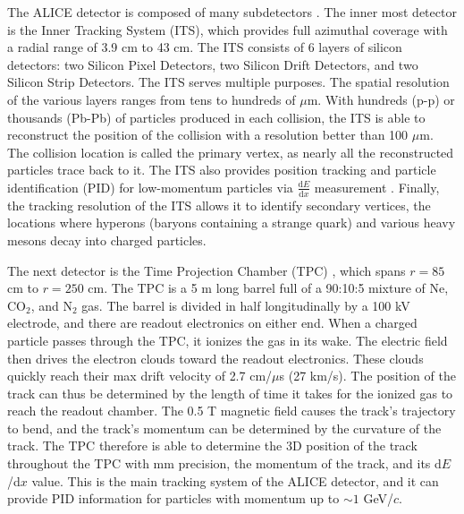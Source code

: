 The ALICE detector is composed of many subdetectors \cite{Aamodt:2008zz}.
The inner most detector is the Inner Tracking System (ITS), which provides full azimuthal coverage with a radial range of 3.9 cm to 43 cm.
The ITS consists of 6 layers of silicon detectors: two Silicon Pixel Detectors, two Silicon Drift Detectors, and two Silicon Strip Detectors.
The ITS serves multiple purposes.
The spatial resolution of the various layers ranges from tens to hundreds of $\mu$m.
With hundreds (p-p) or thousands (Pb-Pb) of particles produced in each collision, the ITS is able to reconstruct the position of the collision with a resolution better than 100 $\mu$m.
The collision location is called the primary vertex, as nearly all the reconstructed particles trace back to it.
The ITS also provides position tracking and particle identification (PID) for low-momentum particles via $\frac{\mathrm{d}E}{\mathrm{d}x}$ measurement \cite{Jackson:1998nia}.
Finally, the tracking resolution of the ITS allows it to identify secondary vertices, the locations where hyperons (baryons containing a strange quark) and various heavy mesons decay into charged particles.

The next detector is the Time Projection Chamber (TPC) \cite{ALICE:2014qrd}, which spans $r=85$ cm to $r=250$ cm.
The TPC is a 5 m long barrel full of a 90:10:5 mixture of Ne, CO$_2$, and N$_2$ gas.
The barrel is divided in half longitudinally by a 100 kV electrode, and there are readout electronics on either end.
When a charged particle passes through the TPC, it ionizes the gas in its wake.
The electric field then drives the electron clouds toward the readout electronics.
These clouds quickly reach their max drift velocity of 2.7 cm/$\mu$s (27 km/s). 
The position of the track can thus be determined by the length of time it takes for the ionized gas to reach the readout chamber.
The 0.5 T magnetic field causes the track's trajectory to bend, and the track's momentum can be determined by the curvature of the track.
The TPC therefore is able to determine the 3D position of the track throughout the TPC with mm precision, the momentum of the track, and its d$E$/d$x$ value.
This is the main tracking system of the ALICE detector, and it can provide PID information for particles with momentum up to $\sim 1$ GeV/$c$.

